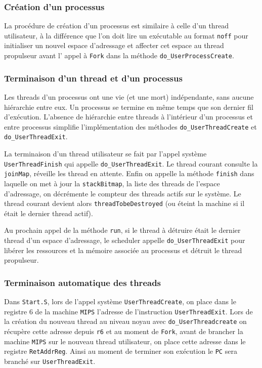 \documentclass[11pt]{article}
\theoremstyle{definition}
\theoremstyle{definition}
\begin{document}
\subsubsection{Création d'un processus}
La procédure de création d'un processus est similaire à celle d'un thread utilisateur, à la différence que l'on doit lire un exécutable au format \texttt{noff} pour initialiser un nouvel espace d'adressage et affecter cet espace au thread propulseur avant l' appel à \texttt{Fork} dans la méthode \texttt{do\_UserProcessCreate}.

\subsubsection{Terminaison d'un thread et d'un processus}
Les threads d'un processus ont une vie (et une mort) indépendante, sans aucune hiérarchie entre eux.
Un processus se termine en même temps que son dernier fil d'exécution.
L'absence de hiérarchie entre threads à l'intérieur d'un processus et entre processus simplifie
l'implémentation des méthodes \texttt{do\_UserThreadCreate} et \texttt{do\_UserThreadExit}.

La terminaison d'un thread utilisateur se fait par l'appel système \texttt{User}\hspace{0pt}\texttt{ThreadFinish} qui appelle \texttt{do\_UserThreadExit}. Le thread courant consulte la \texttt{joinMap}, réveille les thread en attente. Enfin on appelle la méthode \texttt{finish} dans laquelle on met à jour la \texttt{stackBitmap}, la liste des threads de l'espace d'adressage, on décrémente le compteur des threads actifs sur le système. Le thread courant devient alors \texttt{threadTobeDestroyed} (ou éteint la machine si il était le dernier thread actif).

Au prochain appel de la méthode \texttt{run}, si le thread à détruire était le dernier thread d'un espace d'adressage, le scheduler appelle \texttt{do\_UserThreadExit} pour libérer les ressources et la mémoire associée au processus et détruit le thread propulseur.

\subsubsection{Terminaison automatique des threads}
Dans \texttt{Start.S}, lors de l'appel système \texttt{UserThreadCreate}, on place dans le registre $6$ de la machine \texttt{MIPS} l'adresse de l'instruction \texttt{UserThreadExit}.
Lors de la création du nouveau thread au niveau noyau avec \texttt{do\_UserThreadcreate} on récupère
cette adresse depuis \texttt{r6} et au moment de \texttt{Fork}, avant de brancher la machine \texttt{MIPS} sur
le nouveau thread utilisateur, on place cette adresse dans le registre \texttt{RetAddrReg}. Ainsi au moment de terminer son exécution le \texttt{PC} sera branché sur \texttt{UserThreadExit}.
\end{document}
